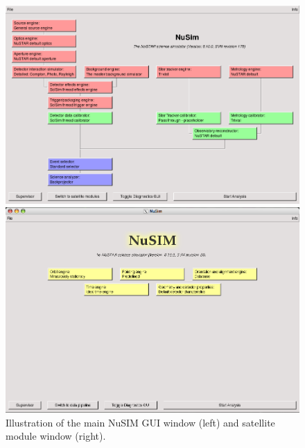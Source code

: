 \begin{figure}[bt]
  \begin{minipage}[c]{0.48\linewidth}
    \begin{center}
      \includegraphics[scale=0.27]{images/MainWindowNormalMode.png}  
    \end{center}
  \end{minipage}
  \hspace{0.04\linewidth}
  \begin{minipage}[c]{0.48\linewidth}
    \begin{center}
      \includegraphics[scale=0.2]{images/satellitegui.png}  
    \end{center}
  \end{minipage}
  \caption{\label{normalwin} Illustration of the main NuSIM GUI window (left) and satellite module window (right).}
\end{figure}

